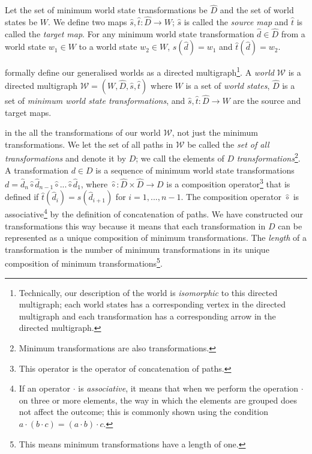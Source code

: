 Let the set of minimum world state transformations be $\hat{D}$ and the set of world states be $W$.
We define two maps $\hat{s},\hat{t}: \hat{D} \to W$; $\hat{s}$ is called the \emph{source map} and $\hat{t}$ is called the \emph{target map}.
For any minimum world state transformation $\hat{d} \in \hat{D}$ from a world state $w_{1} \in W$ to a world state $w_{2} \in W$, $\hat{s}(\hat{d}) = w_{1}$ and $\hat{t}(\hat{d}) = w_{2}$.

 formally define our generalised worlds as a directed multigraph\footnote{Technically, our description of the world is \textit{isomorphic} to this directed multigraph; each world states has a corresponding vertex in the directed multigraph and each transformation has a corresponding arrow in the directed multigraph.}.
A \emph{world} $\mathscr{W}$ is a directed multigraph $\mathscr{W} = (W, \hat{D}, \hat{s}, \hat{t})$ where $W$ is a set of \emph{world states}, $\hat{D}$ is a set of \emph{minimum world state transformations}, and $\hat{s},\hat{t}: \hat{D} \to W$ are the source and target maps.

 in the all the transformations of our world $\mathscr{W}$, not just the minimum transformations.
We let the set of all paths in $\mathscr{W}$ be called the \emph{set of all transformations} and denote it by $D$; we call the elements of $D$ \emph{transformations}\footnote{Minimum transformations are also transformations.}.
A transformation $d \in D$ is a sequence of minimum world state transformations $d = \hat{d}_{n} \hat{\circ} \hat{d}_{n-1} \hat{\circ} ... \hat{\circ} \hat{d}_{1}$, where $\hat{\circ}: \hat{D} \times \hat{D} \to D$ is a composition operator\footnote{This operator is the operator of concatenation of paths.} that is defined if $\hat{t}(\hat{d}_{i}) = \hat{s}(\hat{d}_{i+1})$ for $i = 1, ..., n-1$.
The composition operator $\hat{\circ}$ is associative\footnote{If an operator $\cdot$ is \emph{associative}, it means that when we perform the operation $\cdot$ on three or more elements, the way in which the elements are grouped does not affect the outcome; this is commonly shown using the condition $a \cdot (b \cdot c) = (a \cdot b) \cdot c$.} by the definition of concatenation of paths.
We have constructed our transformations this way because it means that each transformation in $D$ can be represented as a unique composition of minimum transformations. 
The \emph{length} of a transformation is the number of minimum transformations in its unique composition of minimum transformations\footnote{This means minimum transformations have a length of one.}.

